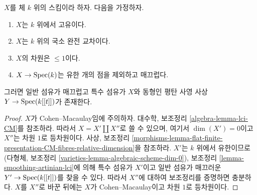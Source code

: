 \begin{lemma}
\label{lemma-smoothing-proper-curve-isolated-lci}
$X$를 체 $k$ 위의 스킴이라 하자. 다음을 가정하자.
\begin{enumerate}
\item $X$는 $k$ 위에서 고유이다.
\item $X$는 $k$ 위의 국소 완전 교차이다.
\item $X$의 차원은 $\leq 1$이다.
\item $X \to \mathop{\mathrm{Spec}}(k)$는 유한 개의 점을 제외하고 매끄럽다.
\end{enumerate}
그러면 일반 섬유가 매끄럽고 특수 섬유가 $X$와 동형인 평탄 사영 사상
$Y \to \mathop{\mathrm{Spec}}(k[[t]])$가 존재한다.
\end{lemma}

\begin{proof}
$X$가 Cohen--Macaulay임에 주의하자. 대수학, 보조정리
\ref{algebra-lemma-lci-CM}를 참조하라. 따라서
$X = X' \amalg X''$로 쓸 수 있으며, 여기서 $\dim(X') = 0$이고 $X''$는
차원 $1$로 등차원이다. 사상, 보조정리
\ref{morphisms-lemma-flat-finite-presentation-CM-fibres-relative-dimension}을
참조하라. $X'$는 $k$ 위에서 유한이므로(다형체, 보조정리
\ref{varieties-lemma-algebraic-scheme-dim-0}), 보조정리
\ref{lemma-smoothing-artinian-lci}에 의해 특수 섬유가 $X'$이고 일반
섬유가 매끄러운 $Y' \to \mathop{\mathrm{Spec}}(k[[t]])$를 찾을 수 있다. 따라서 $X''$에
대하여 보조정리를 증명하면 충분하다. $X$를 $X''$로 바꾼 뒤에는 $X$가
Cohen--Macaulay이고 차원 $1$로 등차원이다.


\end{proof}

